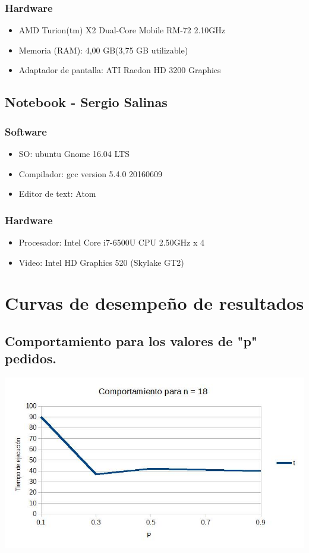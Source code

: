 \documentclass[12pt,letterpaper]{scrartcl}
\begin{document}
\subsubsection{Hardware}
\begin{itemize}
	\item AMD Turion(tm) X2 Dual-Core Mobile RM-72 2.10GHz
	\item Memoria (RAM): 4,00 GB(3,75 GB utilizable)
	\item Adaptador de pantalla: ATI Raedon HD 3200 Graphics
\end{itemize}



\subsection{Notebook - Sergio Salinas}
\subsubsection{Software}
\begin{itemize}
	\item  SO: ubuntu Gnome 16.04 LTS
	\item Compilador: gcc version 5.4.0 20160609
	\item Editor de text: Atom
\end{itemize}

\subsubsection{Hardware}
\begin{itemize}
	\item Procesador: Intel Core i7-6500U CPU  2.50GHz x 4
	\item Video: Intel HD Graphics 520 (Skylake GT2)
\end{itemize}


\newpage

\section{Curvas de desempeño de resultados}
\subsection{Comportamiento para los valores de "p" pedidos.}

\includegraphics[scale=0.55]{n}
\end{document}
